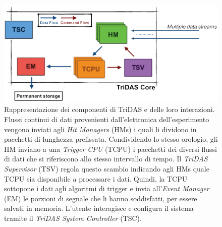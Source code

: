 \documentclass[../main.tex]{subfiles}
\begin{document}
\begin{figure}[tb]
    \centering
    \includegraphics[width=\textwidth]{tridas_scheme_more_trasp.png}
    \caption{
	    Rappresentazione dei componenti di TriDAS e delle loro interazioni. Flussi continui di dati provenienti dall'elettronica dell'esperimento vengono inviati agli \emph{Hit Managers} (HMs) i quali li dividono in pacchetti di lunghezza prefissata. Condividendo lo stesso orologio, gli HM inviano a una \emph{Trigger CPU} (TCPU) i pacchetti dei diversi flussi di dati che si riferiscono allo stesso intervallo di tempo. Il \emph{TriDAS Supervisor} (TSV) regola questo scambio indicando agli HMs quale TCPU sia disponibile a processare i dati. Quindi, la TCPU sottopone i dati agli algoritmi di trigger e invia all'\emph{Event Manager} (EM) le porzioni di segnale che li hanno soddisfatti, per essere salvati in memoria. L'utente interagisce e configura il sistema tramite il \emph{TriDAS System Controller} (TSC).  
	\cite{chiarusi}}
    \label{fig:tridas}
\end{figure}
\end{document}
